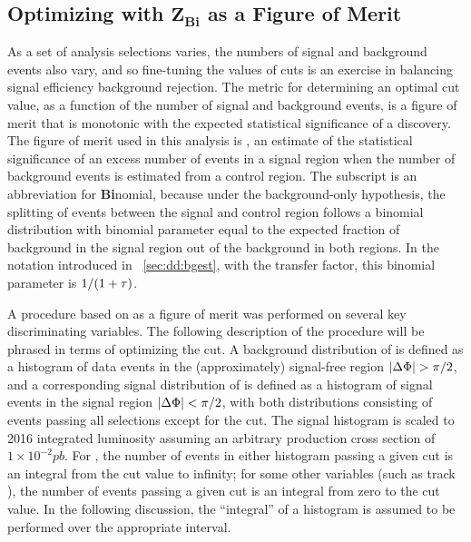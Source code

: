 \subsection[Optimizing with \ZBi as a Figure of Merit]{Optimizing with \texorpdfstring{$\bm{Z_{\mathbf{Bi}}}$}{ZBi} as a Figure of Merit}
\label{sec:dd:cutopt_ZBi}
As a set of analysis selections varies, the numbers of signal and background events also vary, and so fine-tuning the values of cuts is an exercise in balancing signal efficiency \vs background rejection.
The metric for determining an optimal cut value, as a function of the number of signal and background events, is a figure of merit that is monotonic with the expected statistical significance of a discovery.
The figure of merit used in this analysis is \ZBi \cite{Cousins:ZBi2008}, an estimate of the statistical significance of an excess number of events in a signal region when the number of background events is estimated from a control region.
The subscript is an abbreviation for \textbf{Bi}nomial, because under the background-only hypothesis, the splitting of events between the signal and control region follows a binomial distribution with binomial parameter equal to the expected fraction of background in the signal region out of the background in both regions.
In the notation introduced in \Sec~\ref{sec:dd:bgest}, with \TF the transfer factor, this binomial parameter is $1/(1+\tau)$.

A procedure based on \ZBi as a figure of merit was performed on several key discriminating variables.
The following description of the procedure will be phrased in terms of optimizing the \LxySig cut.
A background distribution of \LxySig is defined as a histogram of data events in the (approximately) signal-free region $|\Delta\Phi| > \pi/2$, and a corresponding signal distribution of \LxySig is defined as a histogram of signal events in the signal region \mbox{$|\Delta\Phi| < \pi/2$}, with both distributions consisting of events passing all selections except for the \LxySig cut.
The signal histogram is scaled to 2016 integrated luminosity assuming an arbitrary production cross section of $1\times 10^{-2}\unit{pb}$.
For \LxySig, the number of events in either histogram passing a given cut is an integral from the cut value to infinity; for some other variables (such as track \normchisq), the number of events passing a given cut is an integral from zero to the cut value.
In the following discussion, the ``integral'' of a histogram is assumed to be performed over the appropriate interval.

